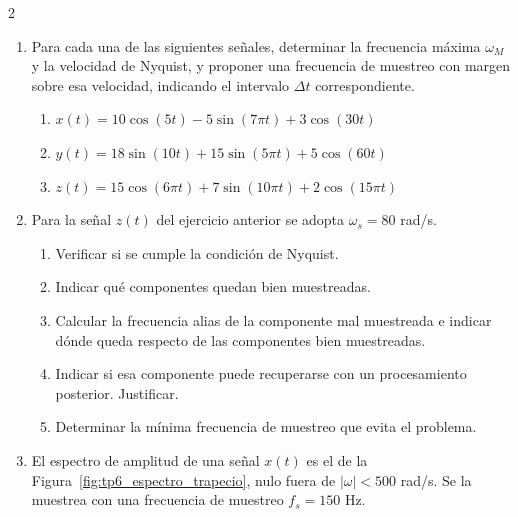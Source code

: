 \documentclass[10pt,a4paper]{article}
\begin{document}
\begin{multicols}{2}
\begin{enumerate}
\begin{enumerate}
		\end{enumerate}

		\textbf{Nyquist y aliasing}

		\item Para cada una de las siguientes señales, determinar la frecuencia
		máxima $\omega_M$ y la velocidad de Nyquist, y proponer una frecuencia de
		muestreo con margen sobre esa velocidad, indicando el intervalo $\Delta t$
		correspondiente.
		\begin{enumerate}
			\item $x(t) = 10\cos(5t) - 5\sin(7\pi t) + 3\cos(30t)$
			\item $y(t) = 18\sin(10t) + 15\sin(5\pi t) + 5\cos(60t)$
			\item $z(t) = 15\cos(6\pi t) + 7\sin(10\pi t) + 2\cos(15\pi t)$

		\end{enumerate}

		\item Para la señal $z(t)$ del ejercicio anterior se adopta
		$\omega_s = 80$ rad/s.
		\begin{enumerate}
			\item Verificar si se cumple la condición de Nyquist.
			\item Indicar qué componentes quedan bien muestreadas.
			\item Calcular la frecuencia alias de la componente mal muestreada
			e indicar dónde queda respecto de las componentes bien muestreadas.
			\item Indicar si esa componente puede recuperarse con un
			procesamiento posterior. Justificar.
			\item Determinar la mínima frecuencia de muestreo que evita el
			problema.
		\end{enumerate}

		\item El espectro de amplitud de una señal $x(t)$ es el de la
		Figura~\ref{fig:tp6_espectro_trapecio}, nulo fuera de $|\omega| < 500$
		rad/s. Se la muestrea con una frecuencia de muestreo $f_s = 150$ Hz.


\end{enumerate}
\end{multicols}
\end{document}

